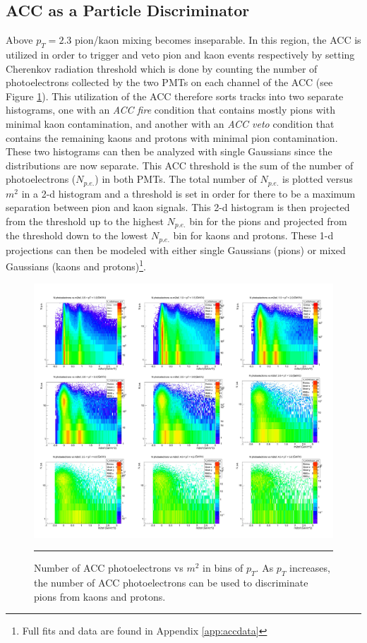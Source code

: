 \subsection{ACC as a Particle Discriminator}

Above $p_T=2.3$ pion/kaon mixing becomes inseparable. In this region, the ACC is utilized in order to trigger and veto pion and kaon events respectively by setting Cherenkov radiation threshold which is done by counting the number of photoelectrons collected by the two PMTs on each channel of the ACC (see Figure \ref{fig:accspread}). This utilization of the ACC therefore sorts tracks into two separate histograms, one with an \textit{ACC fire} condition that contains mostly pions with minimal kaon contamination, and another with an \textit{ACC veto} condition that contains the remaining kaons and protons with minimal pion contamination. These two histograms can then be analyzed with single Gaussians since the distributions are now separate. This ACC threshold is the sum of the number of photoelectrons ($N_{p.e.}$) in both PMTs. The total number of $N_{p.e.}$ is plotted versus $m^2$ in a 2-d histogram and a threshold is set in order for there to be a maximum separation between pion and kaon signals. This 2-d histogram is then projected from the threshold up to the highest $N_{p.e.}$ bin for the pions and projected from the threshold down to the lowest $N_{p.e.}$ bin for kaons and protons. These 1-d projections can then be modeled with either single Gaussians (pions) or mixed Gaussians (kaons and protons)\footnote{Full fits and data are found in Appendix \ref{app:accdata}}.

\begin{figure}[h!]
  \centering 
    \includegraphics[width=1\textwidth]{hiptfits/nphotvsm2.jpg}
    \rule{35em}{0.5pt}
  \caption[Number of ACC photoelectrons vs $m^2$ in bins of $p_T$.]{Number of ACC photoelectrons vs $m^2$ in bins of $p_T$. As $p_T$ increases, the number of ACC photoelectrons can be used to discriminate pions from kaons and protons.}
  \label{fig:accspread}
\end{figure}

